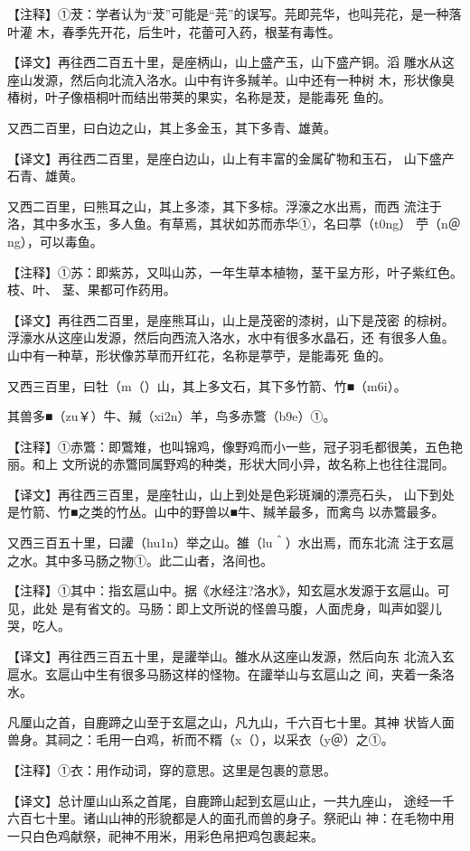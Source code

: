 \documentclass[a4paper,12pt,UTF8,twoside]{ctexbook}
\begin{document}
【注释】①茇：学者认为“茇”可能是“芫”的误写。芫即芫华，也叫芫花，是一种落叶灌 木，春季先开花，后生叶，花蕾可入药，根茎有毒性。

【译文】再往西二百五十里，是座柄山，山上盛产玉，山下盛产铜。滔 雕水从这座山发源，然后向北流入洛水。山中有许多羬羊。山中还有一种树 木，形状像臭椿树，叶子像梧桐叶而结出带荚的果实，名称是茇，是能毒死 鱼的。

又西二百里，曰白边之山，其上多金玉，其下多青、雄黄。

【译文】再往西二百里，是座白边山，山上有丰富的金属矿物和玉石， 山下盛产石青、雄黄。

又西二百里，曰熊耳之山，其上多漆，其下多棕。浮濠之水出焉，而西 流注于洛，其中多水玉，多人鱼。有草焉，其状如苏而赤华①，名曰葶（t0ng） 苧（n＠ng），可以毒鱼。

【注释】①苏：即紫苏，又叫山苏，一年生草本植物，茎干呈方形，叶子紫红色。枝、叶、 茎、果都可作药用。

【译文】再往西二百里，是座熊耳山，山上是茂密的漆树，山下是茂密 的棕树。浮濠水从这座山发源，然后向西流入洛水，水中有很多水晶石，还 有很多人鱼。山中有一种草，形状像苏草而开红花，名称是葶苧，是能毒死 鱼的。

又西三百里，曰牡（m（）山，其上多文石，其下多竹箭、竹■（m6i）。

其兽多■（zu￥）牛、羬（xi2n）羊，鸟多赤鷩（b9e）①。

【注释】①赤鷩：即鷩雉，也叫锦鸡，像野鸡而小一些，冠子羽毛都很美，五色艳丽。和上 文所说的赤鷩同属野鸡的种类，形状大同小异，故名称上也往往混同。

【译文】再往西三百里，是座牡山，山上到处是色彩斑斓的漂亮石头， 山下到处是竹箭、竹■之类的竹丛。山中的野兽以■牛、羬羊最多，而禽鸟 以赤鷩最多。

又西三百五十里，曰讙（hu1n）举之山。雒（lu＾）水出焉，而东北流 注于玄扈之水。其中多马肠之物①。此二山者，洛间也。

【注释】①其中：指玄扈山中。据《水经注?洛水》，知玄扈水发源于玄扈山。可见，此处 是有省文的。马肠：即上文所说的怪兽马腹，人面虎身，叫声如婴儿哭，吃人。

【译文】再往西三百五十里，是讙举山。雒水从这座山发源，然后向东 北流入玄扈水。玄扈山中生有很多马肠这样的怪物。在讙举山与玄扈山之 间，夹着一条洛水。

凡厘山之首，自鹿蹄之山至于玄扈之山，凡九山，千六百七十里。其神 状皆人面兽身。其祠之：毛用一白鸡，祈而不糈（x（），以采衣（y＠）之①。

【注释】①衣：用作动词，穿的意思。这里是包裹的意思。

【译文】总计厘山山系之首尾，自鹿蹄山起到玄扈山止，一共九座山， 途经一千六百七十里。诸山山神的形貌都是人的面孔而兽的身子。祭祀山 神：在毛物中用一只白色鸡献祭，祀神不用米，用彩色帛把鸡包裹起来。
\end{document}
